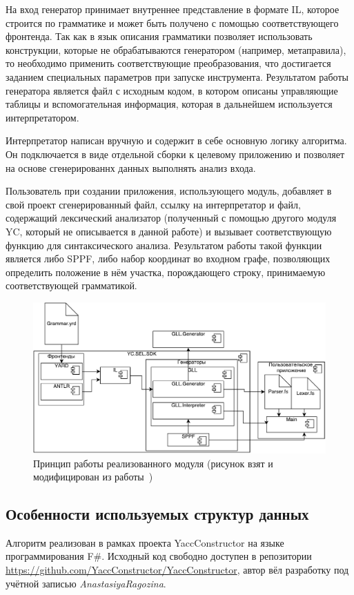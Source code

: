 На вход генератор принимает внутреннее представление в формате IL, которое строится по грамматике и может быть получено с помощью соответствующего фронтенда. Так как в язык описания грамматики позволяет использовать конструкции, которые не обрабатываются генератором (например, метаправила), то необходимо применить соответствующие преобразования, что достигается заданием специальных параметров при запуске инструмента. Результатом работы генератора является файл с исходным кодом, в котором описаны управляющие таблицы и вспомогательная информация, которая в дальнейшем используется интерпретатором. 

Интерпретатор написан вручную и содержит в себе основную логику алгоритма. Он подключается в виде отдельной сборки к целевому приложению и позволяет на основе сгенерированнх данных выполнять анализ входа.

Пользователь при создании приложения, использующего модуль, добавляет в свой проект сгенерированный файл, ссылку на интерпретатор и файл, содержащий лексический анализатор (полученный с помощью другого модуля YC, который не описывается в данной работе) и вызывает соответствующую функцию для синтаксического анализа. Результатом работы такой функции является либо SPPF, либо набор координат во входном графе, позволяющих определить положение в нём участка, порождающего строку, принимаемую соответствующей грамматикой.

\begin{figure}
 \centering
 \includegraphics[width=\textwidth]{Ragozina/pics/GLL_Proc.pdf}
 \caption{Принцип работы реализованного модуля (рисунок взят и модифицирован из работы~\cite{GrigorievPhd})}
 \label{Arch2}
\end{figure}

\subsection{Особенности используемых структур данных}
Алгоритм реализован в рамках проекта YaccConstructor на языке программирования F\#. Исходный код свободно доступен в репозитории \url{https://github.com/YaccConstructor/YaccConstructor}, автор вёл разработку под учётной записью {\it AnastasiyaRagozina}.

